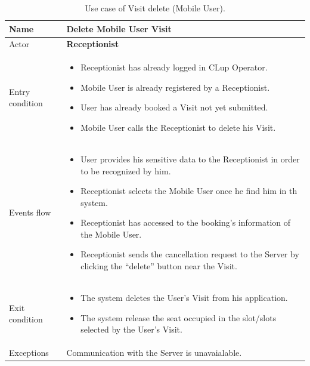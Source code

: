 \begin{table}[H]\begin{tabular}{|p{5cm} | p{7cm} | }
	\hline
	Name & \textbf{Delete Mobile User Visit}  \\
	\hline
	Actor & \textbf{Receptionist} \\
	\hline
	Entry condition &
	\begin{itemize}
        \item Receptionist has already logged in CLup Operator. 
 		\item Mobile User is already registered by a Receptionist.
		\item User has already booked a Visit not yet submitted. 
        \item Mobile User calls the Receptionist to delete his Visit.
	\end{itemize} \\
	\hline
	Events flow & 
	\begin{itemize}
		\item User provides his sensitive data to the Receptionist in order to be recognized by him. 
        \item Receptionist selects the Mobile User once he find him in th system.
		\item Receptionist has accessed to the booking's information of the Mobile User.
		\item Receptionist sends the cancellation request to the Server by clicking the “delete” button near the Visit.
	\end{itemize} \\
	\hline
	Exit condition & \begin{itemize}	
		\item The system deletes the User's Visit from his application.
		\item The system release the seat occupied in the slot/slots selected by the User's Visit.
	\end{itemize}\\
	\hline 
	Exceptions & 
	Communication with the Server is unavaialable. \\
	\hline
\end{tabular}
\caption{Use case of Visit delete (Mobile User).}

\end{table}
\bigbreak

